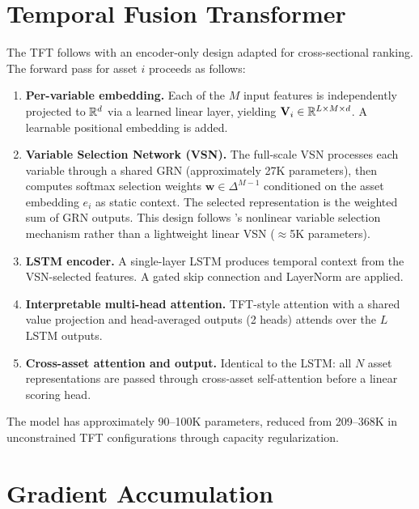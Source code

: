 \section{Temporal Fusion Transformer}
\label{sec:method:tft}

The TFT follows \citet{lim2021temporal} with an encoder-only design
adapted for cross-sectional ranking.
The forward pass for asset $i$ proceeds as follows:

\begin{enumerate}[nosep]
  \item \textbf{Per-variable embedding.}
        Each of the $M$ input features is independently projected to
        $\mathbb{R}^d$ via a learned linear layer, yielding
        $\mathbf{V}_i \in \mathbb{R}^{L \times M \times d}$.
        A learnable positional embedding is added.

  \item \textbf{Variable Selection Network (VSN).}
        The full-scale VSN processes each variable through a shared GRN
        (approximately 27K parameters), then computes softmax selection
        weights $\mathbf{w} \in \Delta^{M-1}$ conditioned on the asset
        embedding $e_i$ as static context.
        The selected representation is the weighted sum of GRN outputs.
        This design follows \citet{lim2021temporal}'s nonlinear variable
        selection mechanism rather than a lightweight linear VSN
        ($\approx$5K parameters).

  \item \textbf{LSTM encoder.}
        A single-layer LSTM produces temporal context from the
        VSN-selected features.
        A gated skip connection and LayerNorm are applied.

  \item \textbf{Interpretable multi-head attention.}
        TFT-style attention with a shared value projection and
        head-averaged outputs (2 heads) attends over the $L$
        LSTM outputs.

  \item \textbf{Cross-asset attention and output.}
        Identical to the LSTM: all $N$ asset representations are passed
        through cross-asset self-attention before a linear scoring head.
\end{enumerate}

\noindent The model has approximately 90--100K parameters, reduced from
209--368K in unconstrained TFT configurations through capacity regularization.

\section{Gradient Accumulation}
\label{sec:method:gradacc}

